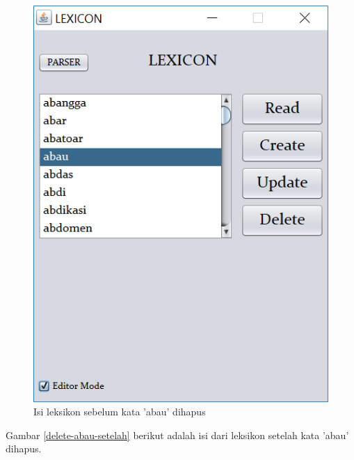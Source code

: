 \begin{figure}[H]
\centering
\includegraphics[scale=0.7]{Gambar/delete-abau-sebelum}
\caption{Isi leksikon sebelum kata 'abau' dihapus} 
\label{delete-abau-sebelum}
\end{figure}

Gambar \ref{delete-abau-setelah} berikut adalah isi dari leksikon setelah kata 'abau' dihapus.

